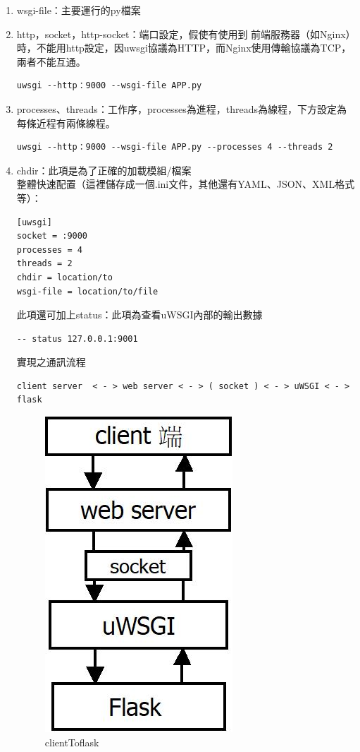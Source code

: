 \documentclass[14pt,a4paper]{report}  %
\begin{document}
 \begin{enumerate} 
 \item wsgi-file：主要運行的py檔案
 \item http，socket，http-socket：端口設定，假使有使用到 前端服務器（如Nginx）時，不能用http設定，因uwsgi協議為HTTP，而Nginx使用傳輸協議為TCP，兩者不能互通。
 \begin{lstlisting}[caption=簡易uwsgi指令啟動]
  uwsgi --http：9000 --wsgi-file APP.py 
\end{lstlisting}
 \item processes、threads：工作序，processes為進程，threads為線程，下方設定為每條近程有兩條線程。
 \begin{lstlisting}[caption=加入工作程序uwsgi指令啟動]
  uwsgi --http：9000 --wsgi-file APP.py --processes 4 --threads 2
\end{lstlisting}
\item chdir：此項是為了正確的加載模組/檔案 \\
整體快速配置（這裡儲存成一個.ini文件，其他還有YAML、JSON、XML格式等）：
\begin{lstlisting}[caption=將uwsgi指令啟動動作設定成一個啟動檔]
  [uwsgi]
socket = :9000
processes = 4
threads = 2
chdir = location/to
wsgi-file = location/to/file
\end{lstlisting}
此項還可加上status：此項為查看uWSGI內部的輸出數據\\
\begin{lstlisting}[caption=status]
  -- status 127.0.0.1:9001
\end{lstlisting}
實現之通訊流程 
\begin{lstlisting}[caption=client端與Flask應用]
  client server  < - > web server < - > ( socket ) < - > uWSGI < - > flask 
\end{lstlisting}
\begin{figure}[hbt!]
\begin{center}
\includegraphics[scale=0.74]{clientToflask}
\caption{\Large clientToflask}\label{clientToflask}
\end{center}
\end{figure}
 \end{enumerate}
\end{document}
